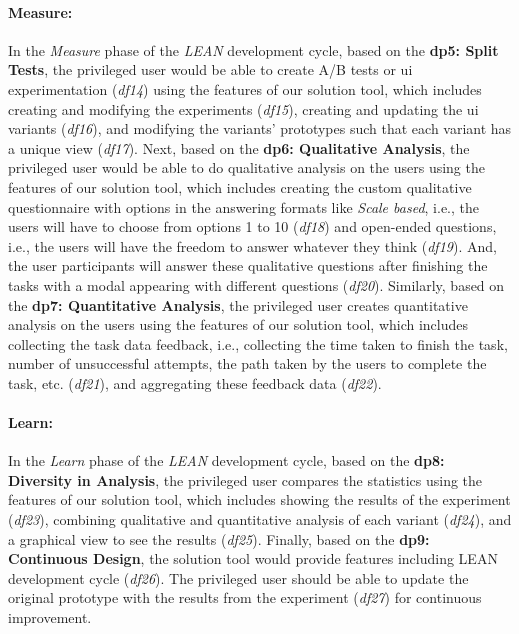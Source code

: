 \paragraph{Measure:}
In the \textit{Measure} phase of the \textit{LEAN} development cycle, based on the \textbf{\ac{dp}5: Split Tests}, the privileged user would be able to create A/B tests or \ac{ui} experimentation (\textit{\ac{df}14}) using the features of our solution tool, which includes creating and modifying the experiments (\textit{\ac{df}15}), creating and updating the \ac{ui} variants (\textit{\ac{df}16}), and modifying the variants' prototypes such that each variant has a unique view (\textit{\ac{df}17}).
Next, based on the \textbf{\ac{dp}6: Qualitative Analysis}, the privileged user would be able to do qualitative analysis on the users using the features of our solution tool, which includes creating the custom qualitative questionnaire with options in the answering formats like \textit{Scale based}, i.e., the users will have to choose from options 1 to 10 (\textit{\ac{df}18}) and open-ended questions, i.e., the users will have the freedom to answer whatever they think (\textit{\ac{df}19}). 
And, the user participants will answer these qualitative questions after finishing the tasks with a modal appearing with different questions (\textit{\ac{df}20}). 
Similarly, based on the \textbf{\ac{dp}7: Quantitative Analysis}, the privileged user creates quantitative analysis on the users using the features of our solution tool, which includes collecting the task data feedback, i.e., collecting the time taken to finish the task, number of unsuccessful attempts, the path taken by the users to complete the task, etc. (\textit{\ac{df}21}), and aggregating these feedback data (\textit{\ac{df}22}). 

\paragraph{Learn:}
In the \textit{Learn} phase of the \textit{LEAN} development cycle, based on the \textbf{\ac{dp}8: Diversity in Analysis}, the privileged user compares the statistics using the features of our solution tool, which includes showing the results of the experiment (\textit{\ac{df}23}), combining qualitative and quantitative analysis of each variant (\textit{\ac{df}24}), and a graphical view to see the results (\textit{\ac{df}25}). 
Finally, based on the \textbf{\ac{dp}9: Continuous Design}, the solution tool would provide features including LEAN development cycle (\textit{\ac{df}26}). 
The privileged user should be able to update the original prototype with the results from the experiment (\textit{\ac{df}27}) for continuous improvement.

